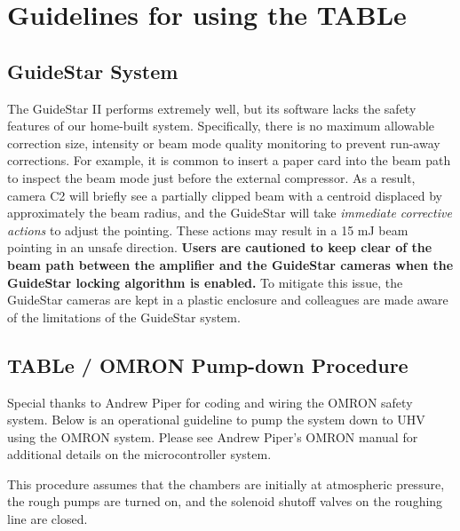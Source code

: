 \chapter{Guidelines for using the TABLe}
\label{appendix:TABLe_manual}

\section{GuideStar System}
\label{sec:guidestar_app}
The GuideStar II performs extremely well, but its software lacks the safety features of our home-built system. Specifically, there is no maximum allowable correction size, intensity or beam mode quality monitoring to prevent run-away corrections. For example, it is common to insert a paper card into the beam path to inspect the beam mode just before the external compressor. As a result, camera C2 will briefly see a partially clipped beam with a centroid displaced by approximately the beam radius, and the GuideStar will take \textit{immediate corrective actions} to adjust the pointing. These actions may result in a 15 mJ beam pointing in an unsafe direction. \textbf{Users are cautioned to keep clear of the beam path between the amplifier and the GuideStar cameras when the GuideStar locking algorithm is enabled.} To mitigate this issue, the GuideStar cameras are kept in a plastic enclosure and colleagues are made aware of the limitations of the GuideStar system.


\section{TABLe / OMRON Pump-down Procedure}
\label{sec:OMRON_instructions}

Special thanks to Andrew Piper for coding and wiring the OMRON safety system. Below is an operational guideline to pump the system down to UHV using the OMRON system. Please see Andrew Piper's OMRON manual for additional details on the microcontroller system.

This procedure assumes that the chambers are initially at atmospheric pressure, the rough pumps are turned on, and the solenoid shutoff valves on the roughing line are closed.

